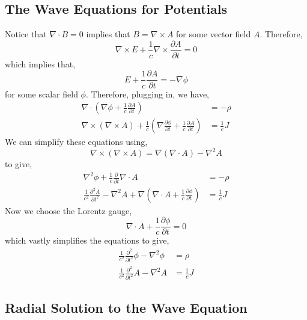 \documentclass[12pt]{extarticle}
\newcommand{\pderiv}[2]{\frac{\partial{#1}}{\partial{#2}}}
\newcommand{\npar}[3]{\frac{\partial^{#1}{#2}}{\partial{#3}^{#1}}}
\theoremstyle{definition}
\begin{document}
\subsection{The Wave Equations for Potentials}

Notice that $\nabla \cdot B = 0$ implies that $B = \nabla \times A$ for some vector field $A$. Therefore,
\[ \nabla \times E + \frac{1}{c} \nabla \times \pderiv{A}{t} = 0 \]
which implies that,
\[ E + \frac{1}{c} \pderiv{A}{t} = - \nabla \phi \]
for some scalar field $\phi$. 
Therefore, plugging in, we have,
\begin{align*}
\nabla \cdot \left(\nabla \phi + \frac{1}{c} \pderiv{A}{t} \right) & = - \rho
\\
\nabla \times (\nabla \times A) + \frac{1}{c} \left( \nabla \pderiv{\phi}{t} + \frac{1}{c} \pderiv{A}{t} \right) & = \frac{1}{c} J 
\end{align*}
We can simplify these equations using,
\[ \nabla \times (\nabla \times A) = \nabla (\nabla \cdot A) - \nabla^2 A \]
to give,
\begin{align*}
\nabla^2 \phi + \frac{1}{c} \pderiv{}{t} \nabla \cdot A & = - \rho 
\\
\frac{1}{c^2} \npar{2}{A}{t}  - \nabla^2 A + \nabla \left( \nabla \cdot A + \frac{1}{c} \pderiv{\phi}{t} \right) & = \frac{1}{c} J 
\end{align*}
Now we choose the Lorentz gauge,
\[ \nabla \cdot A + \frac{1}{c} \pderiv{\phi}{t} = 0 \]
which vastly simplifies the equations to give,
\begin{align*}
\frac{1}{c^2} \npar{2}{}{t} \phi - \nabla^2 \phi  & = \rho 
\\
\frac{1}{c^2} \npar{2}{}{t} A - \nabla^2 A & = \frac{1}{c} J 
\end{align*}

\subsection{Radial Solution to the Wave Equation}
\end{document}
